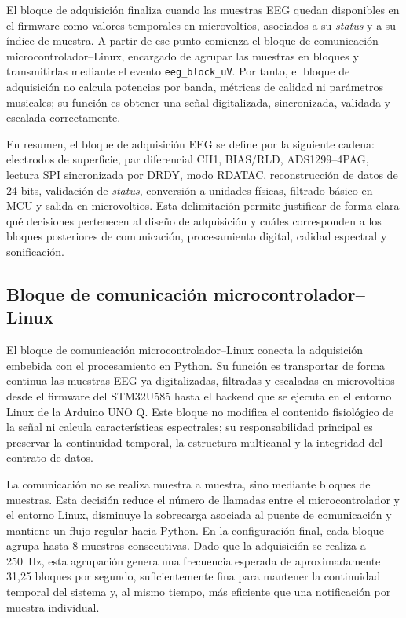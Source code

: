 \documentclass[../main.tex]{subfiles}
\begin{document}
El bloque de adquisición finaliza cuando las muestras EEG quedan disponibles en el firmware como valores temporales en microvoltios, asociados a su \textit{status} y a su índice de muestra. A partir de ese punto comienza el bloque de comunicación microcontrolador--Linux, encargado de agrupar las muestras en bloques y transmitirlas mediante el evento \texttt{eeg\_block\_uV}. Por tanto, el bloque de adquisición no calcula potencias por banda, métricas de calidad ni parámetros musicales; su función es obtener una señal digitalizada, sincronizada, validada y escalada correctamente.

En resumen, el bloque de adquisición EEG se define por la siguiente cadena: electrodos de superficie, par diferencial CH1, BIAS/RLD, ADS1299--4PAG, lectura SPI sincronizada por DRDY, modo RDATAC, reconstrucción de datos de 24 bits, validación de \textit{status}, conversión a unidades físicas, filtrado básico en MCU y salida en microvoltios. Esta delimitación permite justificar de forma clara qué decisiones pertenecen al diseño de adquisición y cuáles corresponden a los bloques posteriores de comunicación, procesamiento digital, calidad espectral y sonificación.

\subsection{Bloque de comunicación microcontrolador--Linux}

El bloque de comunicación microcontrolador--Linux conecta la adquisición embebida con el procesamiento en Python. Su función es transportar de forma continua las muestras EEG ya digitalizadas, filtradas y escaladas en microvoltios desde el firmware del STM32U585 hasta el backend que se ejecuta en el entorno Linux de la Arduino UNO Q. Este bloque no modifica el contenido fisiológico de la señal ni calcula características espectrales; su responsabilidad principal es preservar la continuidad temporal, la estructura multicanal y la integridad del contrato de datos.

La comunicación no se realiza muestra a muestra, sino mediante bloques de muestras. Esta decisión reduce el número de llamadas entre el microcontrolador y el entorno Linux, disminuye la sobrecarga asociada al puente de comunicación y mantiene un flujo regular hacia Python. En la configuración final, cada bloque agrupa hasta 8 muestras consecutivas. Dado que la adquisición se realiza a \SI{250}{\hertz}, esta agrupación genera una frecuencia esperada de aproximadamente 31,25 bloques por segundo, suficientemente fina para mantener la continuidad temporal del sistema y, al mismo tiempo, más eficiente que una notificación por muestra individual.
\end{document}
